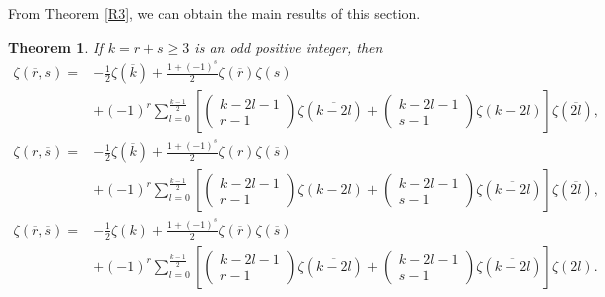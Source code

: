 \documentclass[reqno]{amsart}
\newtheorem{theorem}{Theorem}[section]
\theoremstyle{definition}
\theoremstyle{remark}
\numberwithin{equation}{section}
\begin{document}
From Theorem \ref{R3}, we can obtain the main results of this section.
\begin{theorem}
\label{doubleEuler2} If $k=r+s\geq 3$ is an odd positive integer, then
\begin{equation}\label{eq34}\begin{split}
\zeta(\overline{r}, s)
=&-\frac{1}{2}\zeta(\overline{k})
+\frac{1+(-1)^s}{2}\zeta(\overline{r})\zeta(s)
\\&+(-1)^r\sum_{l=0}^{\frac{k-1}{2}}\left[\begin{pmatrix}k-2l-1\\r-1\end{pmatrix}\zeta(\overline{k-2l})
+ \begin{pmatrix}k-2l-1\\s-1\end{pmatrix}\zeta(k-2l)\right]\zeta(\overline{2l}),
\end{split}\end{equation}
\begin{equation}\label{eq35}\begin{split}
\zeta(r, \overline{s})=&-\frac{1}{2} \zeta(\overline{k})+\frac{1+(-1)^s}{2}\zeta(r)\zeta(\overline{s})
\\&+(-1)^r\sum_{l=0}^{\frac{k-1}{2}} \left[\begin{pmatrix}k-2l-1\\r-1\end{pmatrix}\zeta(k-2l) + \begin{pmatrix}k-2l-1\\s-1\end{pmatrix}\zeta(\overline{k-2l})\right]\zeta(\overline{2l}),
\end{split}\end{equation}
\begin{equation}\label{eq36}\begin{split}
\zeta(\overline{r}, \overline{s})=&-\frac{1}{2}\zeta(k)
+\frac{1+(-1)^s}{2}\zeta(\overline{r})\zeta(\overline{s})
\\&+(-1)^r\sum_{l=0}^{\frac{k-1}{2}}\left[\begin{pmatrix}k-2l-1\\r-1\end{pmatrix}\zeta(\overline{k-2l})
+ \begin{pmatrix}k-2l-1\\s-1\end{pmatrix}\zeta(\overline{k-2l})\right]\zeta(2l).
\end{split}\end{equation}
\end{theorem}
\end{document}
